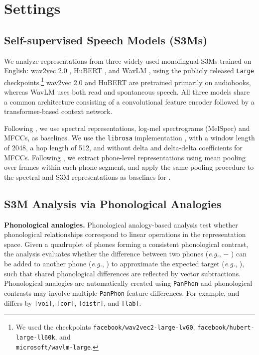 \documentclass[cameraready]{Interspeech}
\begin{document}
\section{Settings}
\subsection{Self-supervised Speech Models (S3Ms)}
We analyze representations from three widely used monolingual S3Ms trained on English: wav2vec 2.0 \cite{baevski2020wav2vec}, HuBERT \cite{hsu2021hubert}, and WavLM \cite{chen2022wavlm}, using the publicly released \texttt{Large} checkpoints.\footnote{We used the checkpoints \texttt{facebook/wav2vec2-large-lv60}, \texttt{facebook/hubert-large-ll60k}, and \\ \texttt{microsoft/wavlm-large}.}
wav2vec 2.0 and HuBERT are pretrained primarily on audiobooks, whereas WavLM uses both read and spontaneous speech.
All three models share a common architecture consisting of a convolutional feature encoder followed by a transformer-based context network.


Following \cite{choi2026self}, we use spectral representations, log-mel spectrograms (MelSpec) and MFCCs, as baselines.
We use the \texttt{librosa} implementation \cite{mcfee2015librosa}, with a window length of 2048, a hop length of 512, and without delta and delta-delta coefficients for MFCCs.
Following \cite{pasad2021layer,pasad2023comparative}, we extract phone-level representations using mean pooling over frames within each phone segment, and apply the same pooling procedure to the spectral and S3M representations as baselines for .


\subsection{S3M Analysis via Phonological Analogies}
\textbf{Phonological analogies.}
Phonological analogy-based analysis \cite{chaabouni2017learning,zouhar2024pwesuite,choi2026self} test whether phonological relationships correspond to linear operations in the representation space.
Given a quadruplet of phones forming a consistent phonological contrast, the analysis evaluates whether the difference between two phones (\textit{e.g.}, \textipa{[b]} $-$ \textipa{[d]}) can be added to another phone (\textit{e.g.}, \textipa{[t]}) to approximate the expected target (\textit{e.g.}, \textipa{[p]}), such that shared phonological differences are reflected by vector subtractions.
Phonological analogies are automatically created using \texttt{PanPhon} \cite{mortensen2016panphon} and phonological contrasts may involve multiple \texttt{PanPhon} feature differences.
For example, \textipa{[b]} and \textipa{[t]} differs by \texttt{[voi]}, \texttt{[cor]}, \texttt{[distr]}, and \texttt{[lab]}.
\end{document}
